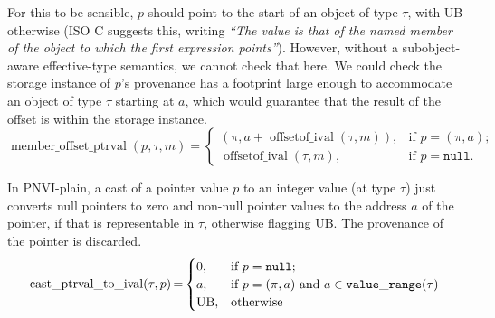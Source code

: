 \documentclass[acmsmall,review,screen]{acmart}\settopmatter{printfolios=true,printccs=false,printacmref=false}
\newcommand{\myparagraph}[1]{\vspace{0.5\baselineskip}\par\noindent{\normalsize\bfseries{#1}}\quad}
\DeclareMathOperator{\intcastPtr}{cast\_ptrval\_to\_ival} %
\DeclareMathOperator{\offsetofIval}{offsetof\_ival}
\DeclareMathOperator{\memberOffset}{member\_offset\_ptrval}
\newcommand{\Null}{\mathtt{null}} %
\begin{document}
For this to be sensible,  
$p$ should point to the start of an object of type $\tau$, with UB otherwise
(ISO C suggests this, writing \emph{``The value is that of the named
member of the object to which the first expression points''}). 
However, without a
subobject-aware effective-type semantics, we cannot check that
here. We could check the storage instance of $p$'s provenance has
a footprint large enough to accommodate an object of type $\tau$
starting at $a$, which would guarantee that the result of the offset
is within the storage instance. 
\[
    \memberOffset(p, \tau, m) =
    \begin{cases}
      (\pi, a + \offsetofIval(\tau, m)),
        &\text{if $p = (\pi, a)$;} \\
      \offsetofIval(\tau, m),
        &\text{if $p = \Null$.}
    \end{cases}
\]



%
%

\myparagraph{Casts (PNVI-plain)}
In PNVI-plain, a cast of a pointer value $p$  to an integer value (at type $\tau$)
just converts null pointers to zero and non-null pointer values to the
address $a$ of the pointer, if that is representable in $\tau$,
otherwise flagging UB.  The provenance of the pointer is discarded. 
\[ \begin{array}{@{}r@{\,}c@{\,}l@{}}
\intcastPtr(\tau, p) &=&
    \begin{cases}
       0,
        &\text{if } p = \Null; \\
       a,
        &\text{if } p = (\pi, a) \text{ and } a \in \mathtt{value\_range}(\tau) \\
      \text{UB},
        &\text{otherwise}
    \end{cases}
\end{array}
\]
\end{document}
